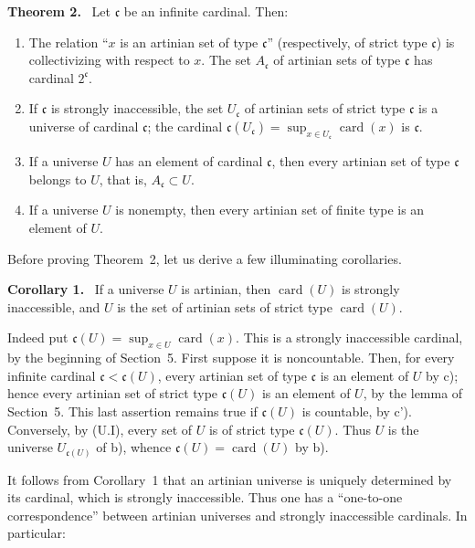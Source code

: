 \documentclass[11pt]{article}
\newcommand{\card}{\operatorname{card}}
\newenvironment{statement}[1]{\par\medskip\noindent\textbf{#1.}\ }{\par\medskip}
\begin{document}
\begin{statement}{Theorem 2}
Let \(\mathfrak c\) be an infinite cardinal. Then:
\begin{enumerate}[label=\alph*)]
\item The relation ``\(x\) is an artinian set of type \(\mathfrak c\)'' (respectively, of strict type \(\mathfrak c\)) is collectivizing with respect to \(x\). The set \(A_{\mathfrak c}\) of artinian sets of type \(\mathfrak c\) has cardinal \(2^{\mathfrak c}\).
\item If \(\mathfrak c\) is strongly inaccessible, the set \(U_{\mathfrak c}\) of artinian sets of strict type \(\mathfrak c\) is a universe of cardinal \(\mathfrak c\); the cardinal \(\mathfrak c(U_{\mathfrak c})=\sup_{x\in U_{\mathfrak c}}\card(x)\) is \(\mathfrak c\).
\item If a universe \(U\) has an element of cardinal \(\mathfrak c\), then every artinian set of type \(\mathfrak c\) belongs to \(U\), that is, \(A_{\mathfrak c}\subset U\).
\item[c')] If a universe \(U\) is nonempty, then every artinian set of finite type is an element of \(U\).
\end{enumerate}
\end{statement}

Before proving Theorem~2, let us derive a few illuminating corollaries.

\begin{statement}{Corollary 1}
If a universe \(U\) is artinian, then \(\card(U)\) is strongly inaccessible, and \(U\) is the set of artinian sets of strict type \(\card(U)\).
\end{statement}
Indeed put \(\mathfrak c(U)=\sup_{x\in U}\card(x)\). This is a strongly inaccessible cardinal, by the beginning of Section~5. First suppose it is noncountable. Then, for every infinite cardinal \(\mathfrak c<\mathfrak c(U)\), every artinian set of type \(\mathfrak c\) is an element of \(U\) by c); hence every artinian set of strict type \(\mathfrak c(U)\) is an element of \(U\), by the lemma of Section~5. This last assertion remains true if \(\mathfrak c(U)\) is countable, by c'). Conversely, by (U.I), every set of \(U\) is of strict type \(\mathfrak c(U)\). Thus \(U\) is the universe \(U_{\mathfrak c(U)}\) of b), whence \(\mathfrak c(U)=\card(U)\) by b).

It follows from Corollary~1 that an artinian universe is uniquely determined by its cardinal, which is strongly inaccessible. Thus one has a ``one-to-one correspondence'' between artinian universes and strongly inaccessible cardinals. In particular:
\end{document}
